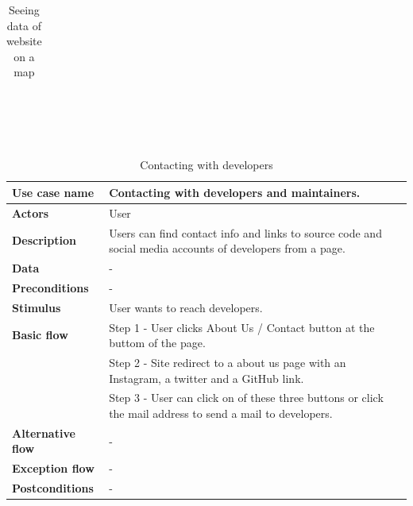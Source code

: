 \begin{center}
\begin{table}[H]
\begin{tabular}{| m{3cm}| m{10cm} |}
            \hline
        \end{tabular}
        \caption[Seeing data of website on a map]{Seeing data of website on a map}
    \end{table}
    ~\\~\\~\\
    \begin{table}[H]
        \begin{tabular}{| m{3cm}| m{10cm} |}
            \hline
            \textbf{Use case name}    & Contacting with developers and maintainers.                                                               \\
            \hline
            \textbf{Actors}           & User                                                                                                      \\
            \hline
            \textbf{Description}      & Users can find contact info and links to source code and social media accounts of developers from a page. \\
            \hline
            \textbf{Data}             & -                                                                                                         \\
            \hline
            \textbf{Preconditions}    & -                                                                                                         \\
            \hline
            \textbf{Stimulus}         & User wants to reach developers.                                                                           \\
            \hline
            \textbf{Basic flow}       & Step 1 - User clicks About Us / Contact button at the buttom of the page.                                 \\
                                      & Step 2 - Site redirect to a about us page with an Instagram, a twitter and a GitHub link.                 \\
                                      & Step 3 - User can click on of these three buttons or click the mail address to send a mail to developers. \\
            \hline
            \textbf{Alternative flow} & -                                                                                                         \\
            \hline
            \textbf{Exception flow}   & -                                                                                                         \\
            \hline
            \textbf{Postconditions}   & -                                                                                                         \\
            \hline
        \end{tabular}
        \caption[Contacting with developers]{Contacting with developers}
    \end{table}
\end{center}

